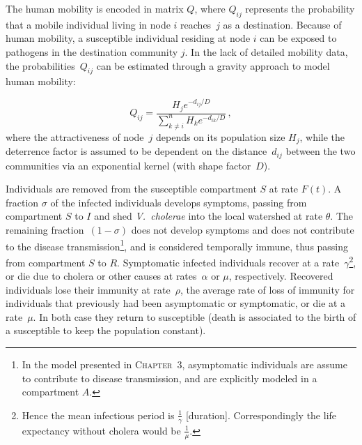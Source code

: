 The human mobility is encoded in matrix $Q$, where $Q_{ij}$ represents the probability that a mobile individual living in node $i$ reaches~$j$ as a destination. Because of human mobility, a susceptible individual residing at node $i$ can be exposed to pathogens in the destination community $j$. 
In the lack of detailed mobility data,  the probabilities~$Q_{ij}$ can be estimated through a gravity approach\cite{Erlander:GravityModelTransportation:1990} to model human mobility:

\begin{equation}
Q_{ij} = \frac{H_j e^{-d_{ij}/D}}{\sum_{k \neq i}^n H_k e^{-d_{ik}/D}} \, ,
\label{eq:mob}
\end{equation}
where the attractiveness of node~$j$ depends on its population size $H_j$, while the deterrence factor is assumed to be dependent on the distance~$d_{ij}$ between the two communities via an exponential kernel (with shape factor~$D$).  

Individuals are removed from the susceptible compartment $S$ at rate $F(t)$.  A fraction $\sigma$ of the infected individuals develops symptoms, passing from compartment $S$ to $I$ and shed \textit{V.~cholerae} into the local watershed at rate $\theta$.  The remaining fraction~$(1-\sigma)$ does not develop symptoms and does not contribute to the disease transmission\footnote{In the model presented in \textsc{Chapter~3}, asymptomatic individuals are assume to contribute to disease transmission, and are explicitly modeled in a compartment $A$.}, and is considered temporally immune, thus passing from compartment $S$ to $R$.  Symptomatic infected individuals recover at a rate~$\gamma$\footnote{Hence the mean infectious period is $\frac{1}{\gamma}$ [duration]. Correspondingly the life expectancy without cholera would be $\frac{1}{\mu}$.}, or die due to cholera or other causes at rates~$\alpha$ or $\mu$, respectively.
Recovered individuals lose their immunity at rate~$\rho$, the average rate of loss of immunity for individuals that previously had been asymptomatic or symptomatic, or die at a rate~$\mu$. In both case they return to susceptible (death is associated to the birth of a susceptible to keep the population constant).

